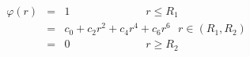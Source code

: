 


\begin{eqnarray*}
\varphi(r) &=& 1 ~~~~~~~~~~~~~~~~~~~~~~~~~~~~~~~r \le R_{1} \\
           &=& c_0  + c_2r^2 + c_4r^4 + c_6r^6 ~~~r \in (R_1, R_2)\\
           &=& 0 ~~~~~~~~~~~~~~~~~~~~~~~~~~~~~~~r\ge R_2
\end{eqnarray*}


